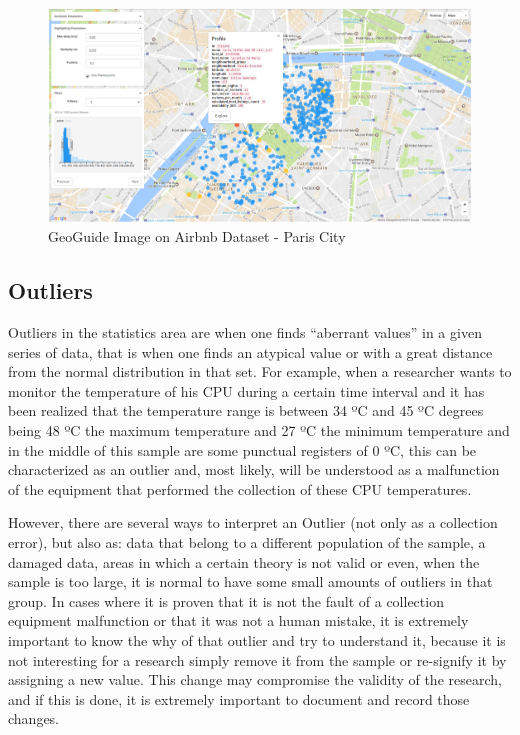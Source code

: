 \begin{figure}[t]
	\centering
	\includegraphics[width=\textwidth]{images/geoguide-example-airbnb}
	\caption{GeoGuide Image on Airbnb Dataset - Paris City}
	\label{fig:geoguide-example-airbnb}
	\vspace{-10pt}
\end{figure}

\subsection{Outliers}


Outliers in the statistics area are when one finds ``aberrant values'' in a given
series of data, that is when one finds an atypical value or with a great distance
from the normal distribution in that set. For example, when a researcher wants to
monitor the temperature of his CPU during a certain time interval and it has been
realized that the temperature range is between 34 ºC and 45 ºC degrees
being 48 ºC the maximum temperature and 27 ºC the minimum temperature and in the
middle of this sample are some punctual registers of 0 ºC, this can be characterized
as an outlier and, most likely, will be understood as a malfunction of the equipment
that performed the collection of these CPU temperatures.

However, there are several ways to interpret an Outlier (not only as a collection
error), but also as: data that belong to a different population of the sample, a
damaged data, areas in which a certain theory is not valid or even, when the sample
is too large, it is normal to have some small amounts of outliers in that group.
In cases where it is proven that it is not the fault of a collection equipment
malfunction or that it was not a human mistake, it is extremely important to know
the why of that outlier and try to understand it, because it is not interesting for
a research simply remove it from the sample or re-signify it by assigning a new
value. This change may compromise the validity of the research, and if this is
done, it is extremely important to document and record those changes.

